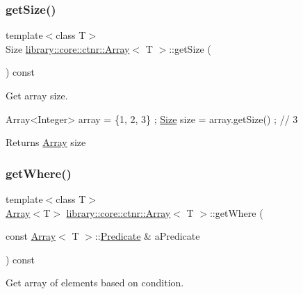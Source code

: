 \subsubsection{\texorpdfstring{get\+Size()}{getSize()}}
{\footnotesize\ttfamily template$<$class T$>$ \\
Size \hyperlink{classlibrary_1_1core_1_1ctnr_1_1_array}{library\+::core\+::ctnr\+::\+Array}$<$ T $>$\+::get\+Size (\begin{DoxyParamCaption}{ }\end{DoxyParamCaption}) const}



Get array size. 


\begin{DoxyCode}
Array<Integer> array = \{1, 2, 3\} ;
\hyperlink{namespacelibrary_1_1core_1_1types_a701626ea1027888ebbb8cfd0ff7adab0}{Size} size = array.getSize() ; \textcolor{comment}{// 3}
\end{DoxyCode}


\begin{DoxyReturn}{Returns}
\hyperlink{classlibrary_1_1core_1_1ctnr_1_1_array}{Array} size 
\end{DoxyReturn}
\mbox{\label{classlibrary_1_1core_1_1ctnr_1_1_array_a62069b24d593b2265422cb8f3a149c44}} 
\subsubsection{\texorpdfstring{get\+Where()}{getWhere()}}
{\footnotesize\ttfamily template$<$class T$>$ \\
\hyperlink{classlibrary_1_1core_1_1ctnr_1_1_array}{Array}$<$T$>$ \hyperlink{classlibrary_1_1core_1_1ctnr_1_1_array}{library\+::core\+::ctnr\+::\+Array}$<$ T $>$\+::get\+Where (\begin{DoxyParamCaption}\item[{const \hyperlink{classlibrary_1_1core_1_1ctnr_1_1_array}{Array}$<$ T $>$\+::\hyperlink{classlibrary_1_1core_1_1ctnr_1_1_array_a74cd325a740870aea490b6b739aa06ae}{Predicate} \&}]{a\+Predicate }\end{DoxyParamCaption}) const}



Get array of elements based on condition. 


